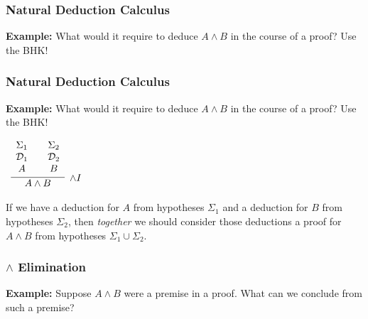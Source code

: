 \documentclass{beamer}
\begin{document}
\begin{frame}
	\frametitle{Natural Deduction Calculus}

	{\bf Example:} What would it require to deduce $A \land B$ in the course of a proof? Use the BHK!

	\vspace{70mm}

\end{frame}

\begin{frame}
	\frametitle{Natural Deduction Calculus}

	{\bf Example:} What would it require to deduce $A \land B$ in the course of a proof? Use the BHK!

	\begin{center}
		$\begin{array}{ c  c  c }			
			\infer[\land I]{A \land B}
				{\begin{array}{ c  c  c }			
					\Sigma_{1} & & \Sigma_{2} \\
					\mathcal{D}_{1} & & \mathcal{D}_{2} \\
					A & & B 
				\end{array}}
		\end{array}$
	\end{center}

	If we have a deduction for $A$ from hypotheses $\Sigma_{1}$ and a deduction for $B$ from hypotheses $\Sigma_{2}$, then \emph{together} we should consider those deductions a proof for $A \land B$ from hypotheses $\Sigma_{1} \cup \Sigma_{2}$.
	\vspace{30mm}

\end{frame}

\begin{frame}
	\frametitle{$\land$ Elimination}
	
	{\bf Example:} Suppose $A\land B$ were a premise in a proof. What can we conclude from such a premise?

	\vspace{60mm}
\end{frame}
\end{document}
